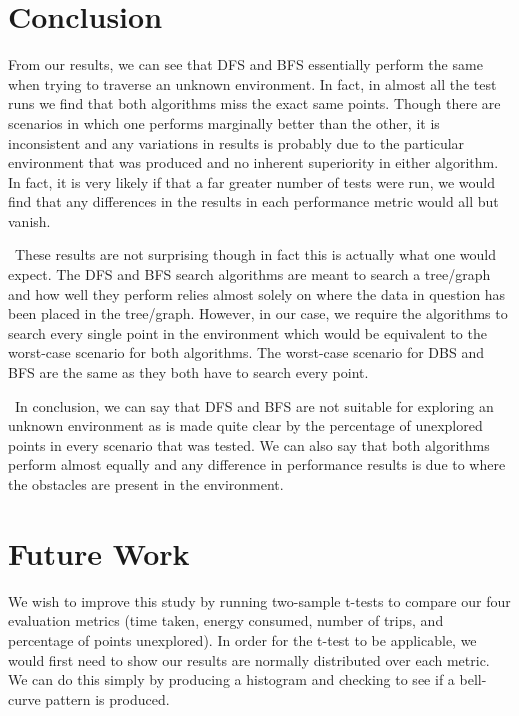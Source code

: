\documentclass[conference]{IEEEtran}
\begin{document}

\newpage
\section{Conclusion}
From our results, we can see that DFS and BFS essentially perform the same when trying to traverse an unknown environment. In fact, in almost all the test runs we find that both algorithms miss the exact same points. Though there are scenarios in which one performs marginally better than the other, it is inconsistent and any variations in results is probably due to the particular environment that was produced and no inherent superiority in either algorithm. In fact, it is very likely if that a far greater number of tests were run, we would find that any differences in the results in each performance metric would all but vanish.

\
These results are not surprising though in fact this is actually what one would expect. The DFS and BFS search algorithms are meant to search a tree/graph and how well they perform relies almost solely on where the data in question has been placed in the tree/graph. However, in our case, we require the algorithms to search every single point in the environment which would be equivalent to the worst-case scenario for both algorithms. The worst-case scenario for DBS and BFS are the same as they both have to search every point.

\
In conclusion, we can say that DFS and BFS are not suitable for exploring an unknown environment as is made quite clear by the percentage of unexplored points in every scenario that was tested. We can also say that both algorithms perform almost equally and any difference in performance results is due to where the obstacles are present in the environment.

\section{Future Work}
We wish to improve this study by running two-sample t-tests to compare our four evaluation metrics (time taken, energy consumed, number of trips, and percentage of points unexplored). In order for the t-test to be applicable, we would first need to show our results are normally distributed over each metric. We can do this simply by producing a histogram and checking to see if a bell-curve pattern is produced.
\end{document}
